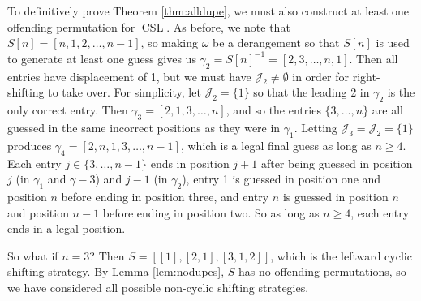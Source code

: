 \documentclass[article]{amsart}
\theoremstyle{plain}
\DeclareMathOperator{\CSL}{CSL}
\begin{document}
To definitively prove Theorem \ref{thm:alldupe}, we must also construct at least one offending permutation for $\CSL$. As before, we note that $S[n] = [n,1,2,\dots,n-1]$, so making $\omega$ be a derangement so that $S[n]$ is used to generate at least one guess gives us $\gamma_2 = S[n]^{-1} = [2,3,\dots,n,1]$. Then all entries have displacement of 1, but we must have $\mathcal{J}_2 \neq \emptyset$ in order for right-shifting to take over. For simplicity, let $\mathcal{J}_2 = \{1\}$ so that the leading 2 in $\gamma_2$ is the only correct entry. Then $\gamma_3 = [2,1,3,\dots,n]$, and so the entries $\{3, \dots, n\}$ are all guessed in the same incorrect positions as they were in $\gamma_1$. Letting $\mathcal{J}_3 = \mathcal{J}_2 = \{1\}$ produces $\gamma_4 = [2,n,1,3,\dots,n-1]$, which is a legal final guess as long as $n \geq 4$. Each entry $j \in \{3, \dots, n-1\}$ ends in position $j+1$ after being guessed in position $j$ (in $\gamma_1$ and $\gamma-3$) and $j-1$ (in $\gamma_2$), entry 1 is guessed in position one and position $n$ before ending in position three, and entry $n$ is guessed in position $n$ and position $n-1$ before ending in position two. So as long as $n \geq 4$, each entry ends in a legal position. 

So what if $n=3$? Then $S = [[1],[2,1],[3,1,2]]$, which is the leftward cyclic shifting strategy. By Lemma \ref{lem:nodupes}, $S$ has no offending permutations, so we have considered all possible non-cyclic shifting strategies.

\end{document}
